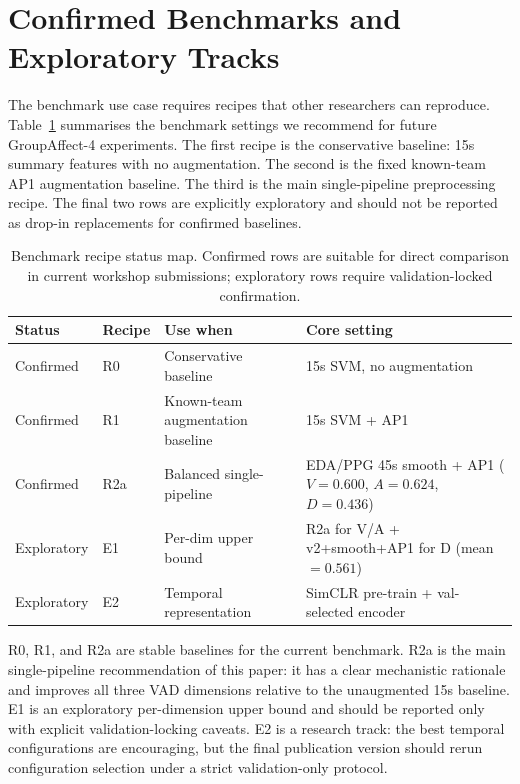 \documentclass[sigconf,review,anonymous]{acmart}
\begin{document}
\section{Confirmed Benchmarks and Exploratory Tracks}
\label{sec:recipes}

The benchmark use case requires recipes that other researchers can reproduce.
Table~\ref{tab:recipes} summarises the benchmark settings we recommend for
future GroupAffect-4 experiments.
The first recipe is the conservative baseline: 15s summary features with no
augmentation.
The second is the fixed known-team AP1 augmentation baseline.
The third is the main single-pipeline preprocessing recipe.
The final two rows are explicitly exploratory and should not be reported as
drop-in replacements for confirmed baselines.

\begin{table}[t]
\caption{Benchmark recipe status map. Confirmed rows are suitable for direct
comparison in current workshop submissions; exploratory rows require
validation-locked confirmation.}
\label{tab:recipes}
\centering
\setlength{\tabcolsep}{2pt}
\footnotesize
\begin{tabular}{p{}p{}p{}p{}}
\toprule
\textbf{Status} & \textbf{Recipe} & \textbf{Use when} & \textbf{Core setting} \\
\midrule
Confirmed & R0 & Conservative baseline & 15s SVM, no augmentation \\
Confirmed & R1 & Known-team augmentation baseline & 15s SVM + AP1 \\
Confirmed & R2a & Balanced single-pipeline & EDA/PPG 45s smooth + AP1 ($V{=}0.600$, $A{=}0.624$, $D{=}0.436$) \\
Exploratory & E1 & Per-dim upper bound & R2a for V/A + v2+smooth+AP1 for D (mean $=0.561$) \\
Exploratory & E2 & Temporal representation & SimCLR pre-train + val-selected encoder \\
\bottomrule
\end{tabular}
\end{table}

R0, R1, and R2a are stable baselines for the current benchmark.
R2a is the main single-pipeline recommendation of this paper: it has a clear
mechanistic rationale and improves all three VAD dimensions relative to the
unaugmented 15s baseline.
E1 is an exploratory per-dimension upper bound and should be reported only
with explicit validation-locking caveats.
E2 is a research track: the best temporal configurations are encouraging, but
the final publication version should rerun configuration selection under a
strict validation-only protocol.
\end{document}
